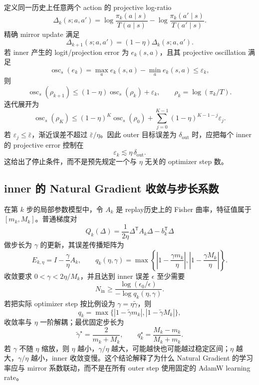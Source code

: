 定义同一历史上任意两个 action 的 projective log-ratio
\[
 \Delta_k(s;a,a')
 =\log\frac{\pi_k(a\mid s)}{T(a\mid s)}
 -\log\frac{\pi_k(a'\mid s)}{T(a'\mid s)}.
\]
精确 mirror update 满足
\begin{equation}
\label{eq:outer-projective-contraction}
 \Delta_{k+1}(s;a,a')=(1-\eta)\Delta_k(s;a,a').
\end{equation}
若 inner 产生的 logit/projection error 为 $e_k(s,a)$，且其 projective oscillation 满足
\[
 \operatorname{osc}_s(e_k)=\max_a e_k(s,a)-\min_a e_k(s,a)\leq\varepsilon_k,
\]
则
\begin{equation}
\label{eq:outer-inexact-recurrence}
 \operatorname{osc}_s(\rho_{k+1})
 \leq (1-\eta)\operatorname{osc}_s(\rho_k)+\varepsilon_k,
 \qquad
 \rho_k=\log(\pi_k/T).
\end{equation}
迭代展开为
\[
 \operatorname{osc}_s(\rho_K)
 \leq (1-\eta)^K\operatorname{osc}_s(\rho_0)
 +\sum_{j=0}^{K-1}(1-\eta)^{K-1-j}\varepsilon_j.
\]
若 $\varepsilon_j\leq\bar\varepsilon$，渐近误差不超过 $\bar\varepsilon/\eta$。因此 outer 目标误差为 $\delta_{\mathrm{out}}$ 时，应把每个 inner 的 projective error 控制在
\[
 \varepsilon_k\lesssim\eta\,\delta_{\mathrm{out}}.
\]
这给出了停止条件，而不是预先规定一个与 $\eta$ 无关的 optimizer step 数。

\subsection{inner 的 Natural Gradient 收敛与步长系数}
\label{subsec:eta-inner-steps}

在第 $k$ 步的局部参数模型中，令 $A_k$ 是 replay历史上的 Fisher 曲率，特征值属于 $[m_k,M_k]$。普通梯度对
\[
 Q_k(\Delta)=\frac{1}{2\eta}\Delta^{\mathsf T}A_k\Delta-b_k^{\mathsf T}\Delta
\]
做步长为 $\gamma$ 的更新，其误差传播矩阵为
\[
 E_{k,\eta}=I-\frac{\gamma}{\eta}A_k,
 \qquad
 q_k(\eta,\gamma)=\max\left\{\left|1-\frac{\gamma m_k}{\eta}\right|,
 \left|1-\frac{\gamma M_k}{\eta}\right|\right\}.
\]
收敛要求 $0<\gamma<2\eta/M_k$，并且达到 inner 误差 $\epsilon$ 至少需要
\begin{equation}
\label{eq:inner-step-count}
 N_{\mathrm{in}}
 \geq
 \frac{\log(\epsilon_0/\epsilon)}{-\log q_k(\eta,\gamma)}.
\end{equation}
若把实际 optimizer step 按比例设为 $\gamma=\eta\widetilde\gamma$，则
\[
 q_k=\max\{|1-\widetilde\gamma m_k|,|1-\widetilde\gamma M_k|\},
\]
收敛率与 $\eta$ 一阶解耦；最优固定步长为
\[
 \widetilde\gamma^\star=\frac{2}{m_k+M_k},
 \qquad
 q_k^\star=\frac{M_k-m_k}{M_k+m_k}.
\]
若 $\gamma$ 不随 $\eta$ 缩放，则 $\eta$ 越小，$\gamma/\eta$ 越大，可能越快也可能越过稳定区间；$\eta$ 越大，$\gamma/\eta$ 越小，inner 收敛变慢。这个结论解释了为什么 Natural Gradient 的学习率应与 mirror 系数联动，而不是在所有 outer step 使用固定的 AdamW learning rate。

